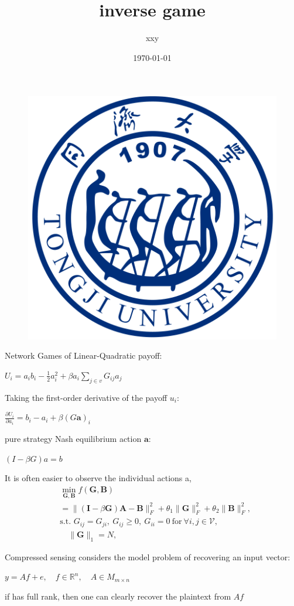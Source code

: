 \documentclass{beamer}
\author{xxy}
\title{inverse game}
\institute{tju}
\date{\today}
\begin{document}
	\begin{frame}
		\titlepage
		\begin{figure}[htpb]
       		\begin{center}
            \includegraphics[width=0.2\linewidth]{pic/tongji_logo.png}
        		\end{center}
    		\end{figure}
	\end{frame}
	
	\begin{frame}{Network Games of Linear-Quadratic}
	\tiny
	payoff:
	\begin{center}
	 	$U_i=a_ib_i-\frac{1}{2}a_i^2+\beta a_i \sum\limits_{j\in v} G_{ij} a_j$
	 \end{center}
	 	Taking the first-order derivative of the payoff $u_i$:
	 	\begin{center}
	 		$\frac{\partial U_i}{\partial a_i}=b_i-a_i+\beta (G \boldsymbol{a})_i$
	 	\end{center}
	 	pure strategy Nash equilibrium action $\boldsymbol{a}$:
	 	\begin{center}
	 		$(I-\beta G)a=b$
	 	\end{center}
	 	It is often easier to observe the
individual actions a,
\begin{align*}
&\underset{\mathbf{G},\mathbf{B}}{\min}f(\mathbf{G},\mathbf{B})\\
&=\|(\mathbf{I}-\beta\mathbf{G})\mathbf{A}-\mathbf{B}\|_{F}^{2}+\theta_{1}\|\mathbf{G}\|_{F}^{2}+\theta_{2}\|\mathbf{B}\|_{F}^{2},\\
&\text{s.t. }G_{ij}=G_{ji},~G_{ij}\geq0,~G_{ii}=0~\text{for}~\forall i,j\in\mathcal{V},\\
&\quad\|\mathbf{G}\|_{1}=N,
\end{align*}
	\end{frame}
	\begin{frame}{Compressed sensing}
		considers the model problem of recovering an
input vector:
\begin{center}
	$y=Af+e,\quad f\in \mathbb{R}^n,\quad A\in M_{m\times n}$
\end{center}
if has full rank,
then one can clearly recover the plaintext from  $Af$
	\end{frame}
	
\end{document}
